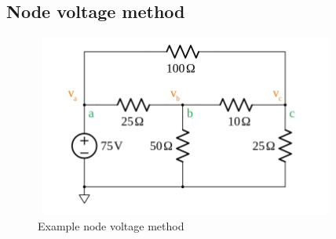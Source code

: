 \newpage
\subsection{Node voltage method}
\begin{figure}[h]
    \vspace{10mm}
    \centering
    \includegraphics[width=10cm, height=6cm]{image/node-voltage-method.png}
    \caption{Example node voltage method}
\end{figure}


